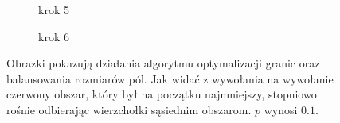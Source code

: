 \begin{figure}[h]
\begin{subfigure}{.5\textwidth}
    \centering
    \caption[short]{krok 5}
\end{subfigure}
\begin{subfigure}{.5\textwidth}
    \centering
    \caption[short]{krok 6}
\end{subfigure}%
\caption{Obrazki pokazują działania algorytmu optymalizacji granic oraz balansowania rozmiarów pól. Jak widać z wywołania
na wywołanie czerwony obszar, który był na początku najmniejszy, stopniowo rośnie odbierając wierzchołki sąsiednim
obszarom. $p$ wynosi $0.1$.}
\label{im:fields_balancing}
\end{figure}

